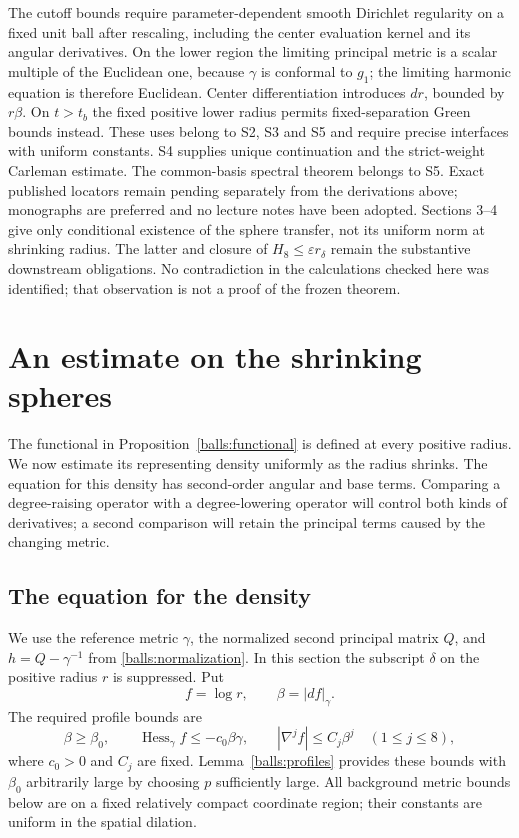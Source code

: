 \documentclass[11pt]{article}
\theoremstyle{definition}
\theoremstyle{remark}
\numberwithin{equation}{section}
\begin{document}
The cutoff bounds require parameter-dependent smooth Dirichlet regularity
on a fixed unit ball after rescaling, including the center evaluation
kernel and its angular derivatives. On the lower region the limiting
principal metric is a scalar multiple of the Euclidean one, because
$\gamma$ is conformal to $g_1$; the limiting harmonic equation is therefore
Euclidean. Center differentiation introduces $dr$, bounded by $r\beta$.
On $t>t_b$ the fixed positive lower radius permits fixed-separation Green
bounds instead. These uses belong to S2, S3 and S5 and require precise
interfaces with uniform constants. S4 supplies unique continuation and
the strict-weight Carleman estimate. The common-basis spectral theorem
belongs to S5. Exact published locators remain pending separately from
the derivations above; monographs are preferred and no lecture notes
have been adopted. Sections 3--4 give only conditional existence of the
sphere transfer, not its uniform norm at shrinking radius. The latter
and closure of $H_8\le\varepsilon r_\delta$ remain the substantive
downstream obligations. No contradiction in the calculations checked
here was identified; that observation is not a proof of the frozen theorem.

\section{An estimate on the shrinking spheres}
\label{sec:angular}

The functional in Proposition~\ref{balls:functional} is defined at every positive
radius.  We now estimate its representing density uniformly as the radius
shrinks.  The equation for this density has second-order angular and base
terms.  Comparing a degree-raising operator with a degree-lowering operator
will control both kinds of derivatives; a second comparison will retain the
principal terms caused by the changing metric.

\subsection{The equation for the density}

We use the reference metric $\gamma$, the normalized second principal
matrix $Q$, and $h=Q-\gamma^{-1}$ from
\eqref{balls:normalization}.  In this section the subscript $\delta$ on the positive
radius $r$ is suppressed.  Put
\[
 f=\log r,\qquad \beta=|df|_\gamma.
\]
The required profile bounds are
\begin{equation}\label{angular:profile-bounds}
 \beta\ge\beta_0,\qquad
 \operatorname{Hess}_\gamma f\le-c_0\beta\gamma,
 \qquad |\nabla^j f|\le C_j\beta^j\quad(1\le j\le8),
\end{equation}
where $c_0>0$ and $C_j$ are fixed.  Lemma~\ref{balls:profiles} provides
these bounds with $\beta_0$ arbitrarily large by choosing $p$
sufficiently large.  All background metric bounds
below are on a fixed relatively compact coordinate region; their constants
are uniform in the spatial dilation.
\end{document}

